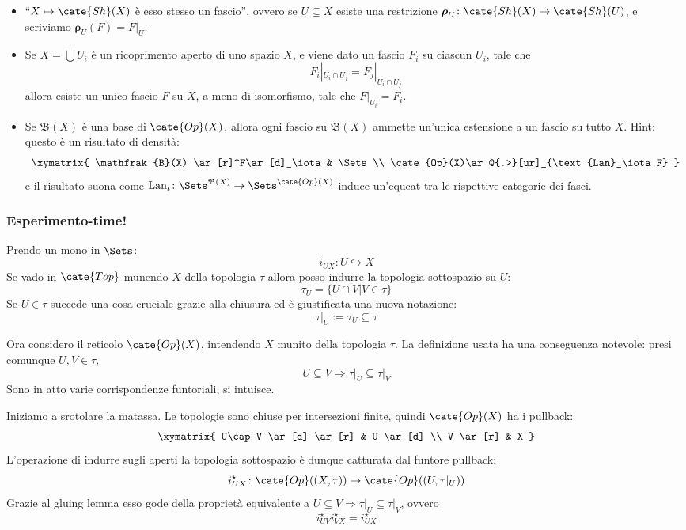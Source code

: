 \begin{MyExercise} 
\begin{itemize}
\item ``$X\mapsto \cate{Sh}(X)$ \`e esso stesso un fascio'', ovvero se $U\subseteq X$ esiste una restrizione $\boldsymbol\rho_U\colon \cate{Sh}(X)\to \cate{Sh}(U)$, e scriviamo $\boldsymbol\rho_U(F)=F|_U$.
\item Se $X=\bigcup U_i$ \`e un ricoprimento aperto di uno spazio $X$, e viene dato un fascio $F_i$ su ciascun $U_i$, tale che
\[
F_i|_{U_i\cap U_j} = F_j|_{U_i\cap U_j}
\]
allora esiste un unico fascio $F$ su $X$, a meno di isomorfismo, tale che $F|_{U_i} = F_i$.
\item Se $\mathfrak B(X)$ \`e una base di $\cate{Op}(X)$, allora ogni fascio su $\mathfrak B(X)$ ammette un'unica estensione a un fascio su tutto $X$. Hint: questo \`e un risultato di densit\`a: 
\[
\xymatrix{
\mathfrak{B}(X) \ar[r]^F\ar[d]_\iota & \Sets\\
\cate{Op}(X)\ar@{.>}[ur]_{\text{Lan}_\iota F}
}
\]
e il risultato suona come $\text{Lan}_\iota\colon \Sets^{\mathfrak B(X)}\to \Sets^{\cate{Op}(X)}$ induce un'equcat tra le rispettive categorie dei fasci.
\end{itemize}
\end{MyExercise}

\subsubsection*{Esperimento-time!}

Prendo un mono in $\Sets$:
\[i_{UX}\colon U\hookrightarrow X\]
Se vado in $\cate{Top}$ munendo $X$ della topologia $\tau$ allora posso indurre la topologia sottospazio su $U$:
\[ \tau_U = \{ U\cap V \vert V\in\tau \} \]
Se $U\in\tau$ succede una cosa cruciale grazie alla chiusura ed è giustificata una nuova notazione:
\[ \tau\vert_U := \tau_U \subseteq \tau \]

Ora considero il reticolo $\cate{Op}(X)$, intendendo $X$ munito della topologia $\tau$.
La definizione usata ha una conseguenza notevole: presi comunque $U,V\in\tau$,
\[
U\subseteq V \Rightarrow \tau\vert_U\subseteq\tau\vert_V
\]
Sono in atto varie corrispondenze funtoriali, si intuisce.

Iniziamo a srotolare la matassa.
Le topologie sono chiuse per intersezioni finite, quindi $\cate{Op}(X)$ ha i pullback:
\[\xymatrix{
U\cap V \ar[d] \ar[r] & U \ar[d] \\
V \ar[r] & X
}\]
L'operazione di indurre sugli aperti la topologia sottospazio è dunque catturata dal funtore pullback:
\[ i^\star_{UX}\colon\cate{Op}((X,\tau))\to\cate{Op}((U,\tau\vert_U)) \]
Grazie al gluing lemma esso gode della proprietà equivalente a $U\subseteq V \Rightarrow \tau\vert_U\subseteq\tau\vert_V$, ovvero
\[ i^\star_{UV}i^\star_{VX} = i^\star_{UX}\]

